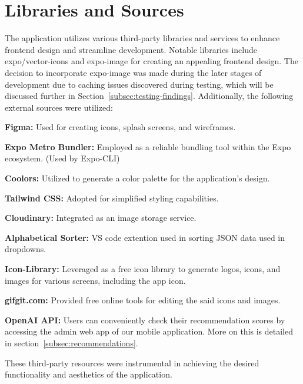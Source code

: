 \section{Libraries and Sources}\label{sec:libraries}
The application utilizes various third-party libraries and services to enhance frontend design and streamline development. Notable libraries include expo/vector-icons and expo-image for creating an appealing frontend design. The decision to incorporate expo-image was made during the later stages of development due to caching issues discovered during testing, which will be discussed further in Section~\ref{subsec:testing-findings}.
Additionally, the following external sources were utilized:
\begin{compactitem}
    \item \textbf{Figma:} Used for creating icons, splash screens, and wireframes.
    \item \textbf{Expo Metro Bundler:} Employed as a reliable bundling tool within the Expo ecosystem. (Used by Expo-CLI) \cite{MetroDoc}
    \item \textbf{Coolors:} Utilized to generate a color palette for the application's design. \cite{coolors}
    \item \textbf{Tailwind CSS:} Adopted for simplified styling capabilities. \cite{tailwind}
    \item \textbf{Cloudinary:} Integrated as an image storage service. \cite{cloudinary}
    \item \textbf{Alphabetical Sorter:} VS code extention used in sorting JSON data used in dropdowns.
    \item \textbf{Icon-Library:} Leveraged as a free icon library to generate logos, icons, and images for various screens, including the app icon. \cite{icon-library}
    \item \textbf{gifgit.com:} Provided free online tools for editing the said icons and images.
    \item \textbf{OpenAI API:} Users can conveniently check their recommendation scores by accessing the admin web app of our mobile application. More on this is detailed in section~\ref{subsec:recommendations}.
\end{compactitem}
These third-party resources were instrumental in achieving the desired functionality and aesthetics of the application.
